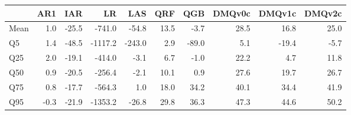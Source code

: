 \begin{tabular}{lrrrrrrrrr}
\toprule
 & AR1 & IAR & LR & LAS & QRF & QGB & DMQv0c & DMQv1c & DMQv2c \\
\midrule
Mean & 1.0 & -25.5 & -741.0 & -54.8 & 13.5 & -3.7 & 28.5 & 16.8 & 25.0 \\
Q5 & 1.4 & -48.5 & -1117.2 & -243.0 & 2.9 & -89.0 & 5.1 & -19.4 & -5.7 \\
Q25 & 2.0 & -19.1 & -414.0 & -3.1 & 6.7 & -1.0 & 22.2 & 4.7 & 11.8 \\
Q50 & 0.9 & -20.5 & -256.4 & -2.1 & 10.1 & 0.9 & 27.6 & 19.7 & 26.7 \\
Q75 & 0.8 & -17.7 & -564.3 & 1.0 & 18.0 & 34.2 & 40.1 & 34.4 & 41.9 \\
Q95 & -0.3 & -21.9 & -1353.2 & -26.8 & 29.8 & 36.3 & 47.3 & 44.6 & 50.2 \\
\bottomrule
\end{tabular}
